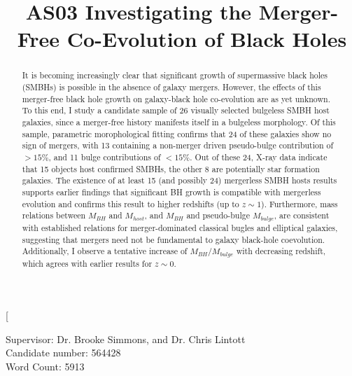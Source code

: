 \documentclass[11pt,twocolumn]{article}
\begin{document}
\title{AS03 Investigating the Merger-Free Co-Evolution of Black Holes}

\date{}

\twocolumn[
  \begin{@twocolumnfalse}
\vspace{-3em}

Supervisor: Dr. Brooke Simmons, and Dr. Chris Lintott\\
Candidate number: 564428\\
Word Count: 5913\\
    \maketitle

\vspace{-5em}

\renewcommand{\abstractname}{\normalsize Abstract}
    \begin{abstract}
\normalsize
\noindent
 It is becoming increasingly clear that significant growth of supermassive black holes (SMBHs) is possible in the absence of galaxy mergers. However, the effects of this merger-free black hole growth on galaxy-black hole co-evolution are as yet unknown. To this end, I study a candidate sample of 26 visually selected bulgeless SMBH host galaxies, since a merger-free history manifests itself in a bulgeless morphology. Of this sample, parametric morophological fitting confirms that 24 of these galaxies show no sign of mergers, with 13 containing a non-merger driven pseudo-bulge contribution of  $>15 \%$, and 11 bulge contributions of $<15\%$. Out of these 24, X-ray data indicate that 15 objects host confirmed SMBHs, the other 8 are potentially star formation galaxies.  The existence of at least 15 (and possibly 24) mergerless SMBH hosts results supports earlier findings that significant BH growth is compatible with mergerless evolution and confirms this result to higher redshifts (up to $ z\sim1$). Furthermore, mass relations between $M_{BH}$ and $M_{host}$, and $M_{BH}$ and pseudo-bulge $M_{bulge}$, are consistent with established relations for merger-dominated classical bugles and elliptical galaxies, suggesting that mergers need not be fundamental to galaxy black-hole coevolution. Additionally, I observe a tentative increase of $M_{BH}/M_{bulge}$ with decreasing redshift, which agrees with earlier results for $z\sim 0$. 


\end{abstract}
\end{@twocolumnfalse}
\end{document}
